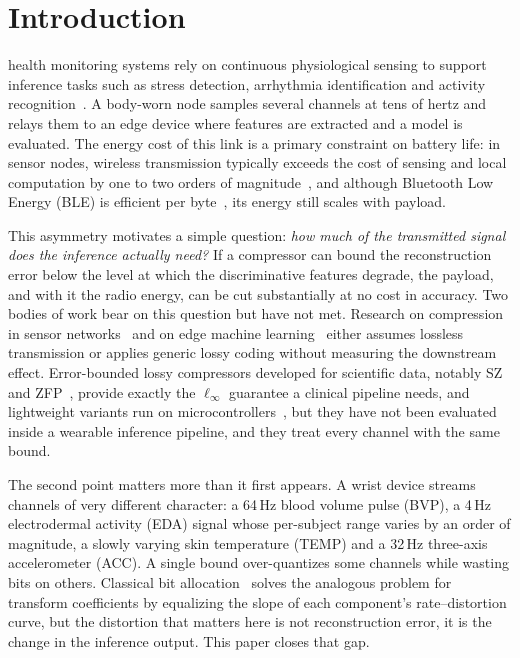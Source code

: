 \documentclass[journal]{IEEEtran}
\begin{document}
\section{Introduction}
 health monitoring systems rely on continuous physiological sensing to support inference tasks such as stress detection, arrhythmia identification and activity recognition~\cite{shi2016,zhou2019}. A body-worn node samples several channels at tens of hertz and relays them to an edge device where features are extracted and a model is evaluated. The energy cost of this link is a primary constraint on battery life: in sensor nodes, wireless transmission typically exceeds the cost of sensing and local computation by one to two orders of magnitude~\cite{anastasi2009}, and although Bluetooth Low Energy (BLE) is efficient per byte~\cite{siekkinen2012}, its energy still scales with payload.

This asymmetry motivates a simple question: \emph{how much of the transmitted signal does the inference actually need?} If a compressor can bound the reconstruction error below the level at which the discriminative features degrade, the payload, and with it the radio energy, can be cut substantially at no cost in accuracy. Two bodies of work bear on this question but have not met. Research on compression in sensor networks~\cite{razzaque2013,jalaleddine1990,ramakrishnan1997} and on edge machine learning~\cite{li2018,zhou2019} either assumes lossless transmission or applies generic lossy coding without measuring the downstream effect. Error-bounded lossy compressors developed for scientific data, notably SZ~\cite{di2016,tao2017,liang2018} and ZFP~\cite{lindstrom2014}, provide exactly the $\ell_\infty$ guarantee a clinical pipeline needs, and lightweight variants run on microcontrollers~\cite{azar2022}, but they have not been evaluated inside a wearable inference pipeline, and they treat every channel with the same bound.

The second point matters more than it first appears. A wrist device streams channels of very different character: a 64\,Hz blood volume pulse (BVP), a 4\,Hz electrodermal activity (EDA) signal whose per-subject range varies by an order of magnitude, a slowly varying skin temperature (TEMP) and a 32\,Hz three-axis accelerometer (ACC). A single bound over-quantizes some channels while wasting bits on others. Classical bit allocation~\cite{shoham1988,gersho1992} solves the analogous problem for transform coefficients by equalizing the slope of each component's rate--distortion curve, but the distortion that matters here is not reconstruction error, it is the change in the inference output. This paper closes that gap.
\end{document}
